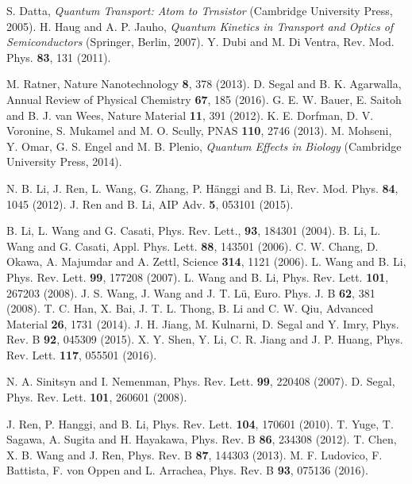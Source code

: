 \documentclass[twocolumn,preprintnumbers,amsmath,amssymb]{revtex4}
\begin{document}
\begin{thebibliography}{99}

 S. Datta, \emph{Quantum Transport: Atom to Trnsistor} (Cambridge University Press, 2005).
 H. Haug and A. P. Jauho, \emph{Quantum Kinetics in Transport and Optics of Semiconductors} (Springer, Berlin, 2007).
 Y. Dubi and M. Di Ventra, Rev. Mod. Phys. \textbf{83}, 131 (2011).

 M. Ratner, Nature Nanotechnology \textbf{8}, 378 (2013).
 D. Segal and B. K. Agarwalla, Annual Review of Physical Chemistry \textbf{67}, 185 (2016).
 G. E. W. Bauer, E. Saitoh and B. J. van Wees, Nature Material \textbf{11}, 391 (2012).
 K. E. Dorfman, D. V. Voronine, S. Mukamel and M. O. Scully, PNAS \textbf{110}, 2746 (2013).
 M. Mohseni, Y. Omar, G. S. Engel and M. B. Plenio, \emph{Quantum Effects in Biology} (Cambridge University Press, 2014).

 N. B. Li, J. Ren, L. Wang, G. Zhang, P. H\"{a}nggi and B.  Li, Rev. Mod. Phys. \textbf{84}, 1045 (2012).
 J. Ren and B. Li, AIP Adv. \textbf{5}, 053101 (2015).

 B.	Li,	L.	Wang and G.	Casati,	Phys. Rev. Lett., \textbf{93}, 184301 (2004).
 B. Li, L. Wang and G. Casati, Appl. Phys. Lett. \textbf{88}, 143501 (2006).
 C. W. Chang, D. Okawa, A. Majumdar and A. Zettl, Science \textbf{314}, 1121 (2006).
 L. Wang	and	B.	Li,	Phys. Rev. Lett. \textbf{99}, 177208	(2007).
 L. Wang	and	B.	Li,	Phys. Rev. Lett. \textbf{101}, 267203	(2008).
 J. S. Wang, J. Wang and J. T. L\"{u}, Euro. Phys. J. B \textbf{62}, 381 (2008).
 T. C.	Han,	X.	Bai,	J.	T.	L.	Thong,	B.	Li and	C. W.	Qiu,
Advanced	Material \textbf{26}, 1731	(2014).	
 J. H. Jiang, M. Kulnarni, D. Segal and Y. Imry, Phys. Rev. B \textbf{92}, 045309 (2015).
 X. Y. Shen, Y. Li, C. R. Jiang and J. P. Huang, Phys. Rev. Lett. \textbf{117}, 055501 (2016).


 N. A. Sinitsyn and I. Nemenman, Phys. Rev. Lett. \textbf{99}, 220408 (2007).
 D. Segal, Phys. Rev. Lett. \textbf{101}, 260601 (2008).


 J. Ren, P. Hanggi, and B. Li, Phys. Rev. Lett. \textbf{104}, 170601 (2010).
 T. Yuge, T. Sagawa, A. Sugita and H. Hayakawa, Phys. Rev. B \textbf{86}, 234308 (2012).
 T. Chen, X. B. Wang and J. Ren, Phys. Rev. B \textbf{87}, 144303 (2013).
 M. F. Ludovico, F. Battista, F. von Oppen and L. Arrachea, Phys. Rev. B \textbf{93}, 075136 (2016).


\end{thebibliography}
\end{document}
